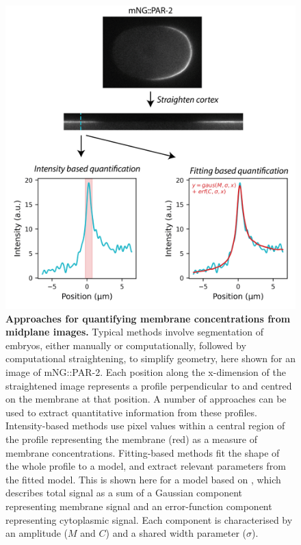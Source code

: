 \documentclass[12pt]{"article"}
\newcommand{\mycaption}[2]{\caption[#1]{\textbf{#1.} #2}}
\begin{document}
\begin{figure}
\includegraphics[scale=1]{memquant_method_comparison}
\centering
\mycaption{Approaches for quantifying membrane concentrations from midplane images}{Typical methods involve segmentation of embryos, either manually or computationally, followed by computational straightening, to simplify geometry, here shown for an image of mNG::PAR-2. Each position along the x-dimension of the straightened image represents a profile perpendicular to and centred on the membrane at that position. A number of approaches can be used to extract quantitative information from these profiles. Intensity-based methods use pixel values within a central region of the profile representing the membrane (red) as a measure of membrane concentrations. Fitting-based methods fit the shape of the whole profile to a model, and extract relevant parameters from the fitted model. This is shown here for a model based on \textcite{Gross2018}, which describes total signal as a sum of a Gaussian component representing membrane signal and an error-function component representing cytoplasmic signal. Each component is characterised by an amplitude ($M$ and $C$) and a shared width parameter ($\sigma$).
}
\label{fig:memquant_method_comparison}
\end{figure}
\end{document}
